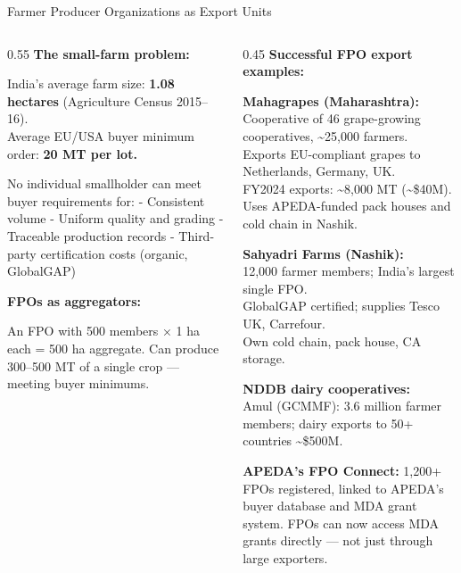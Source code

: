 \documentclass[
  ignorenonframetext,
  aspectratio=169,
]{beamer}
\makeatletter
\let\quarto@originallabel\label
\DeclareRobustCommand*{\label}[1]{\quarto@originallabel{#1}}
\makeatother
\begin{document}
\begin{frame}{Farmer Producer Organizations as Export Units}
\label{farmer-producer-organizations-as-export-units}
\begin{columns}[T]
\begin{column}{0.55\linewidth}
\textbf{The small-farm problem:}

India's average farm size: \textbf{1.08 hectares} (Agriculture Census
2015--16).\\
Average EU/USA buyer minimum order: \textbf{20 MT per lot.}

No individual smallholder can meet buyer requirements for: - Consistent
volume - Uniform quality and grading - Traceable production records -
Third-party certification costs (organic, GlobalGAP)

\textbf{FPOs as aggregators:}

An FPO with 500 members × 1 ha each = 500 ha aggregate. Can produce
300--500 MT of a single crop --- meeting buyer minimums.
\end{column}

\begin{column}{0.45\linewidth}
\textbf{Successful FPO export examples:}

\textbf{Mahagrapes (Maharashtra):}\\
Cooperative of 46 grape-growing cooperatives, \textasciitilde25,000
farmers.\\
Exports EU-compliant grapes to Netherlands, Germany, UK.\\
FY2024 exports: \textasciitilde8,000 MT (\textasciitilde\$40M).\\
Uses APEDA-funded pack houses and cold chain in Nashik.

\textbf{Sahyadri Farms (Nashik):}\\
12,000 farmer members; India's largest single FPO.\\
GlobalGAP certified; supplies Tesco UK, Carrefour.\\
Own cold chain, pack house, CA storage.

\textbf{NDDB dairy cooperatives:}\\
Amul (GCMMF): 3.6 million farmer members; dairy exports to 50+ countries
\textasciitilde\$500M.

\textbf{APEDA's FPO Connect:} 1,200+ FPOs registered, linked to APEDA's
buyer database and MDA grant system. FPOs can now access MDA grants
directly --- not just through large exporters.
\end{column}
\end{columns}
\end{frame}
\end{document}

